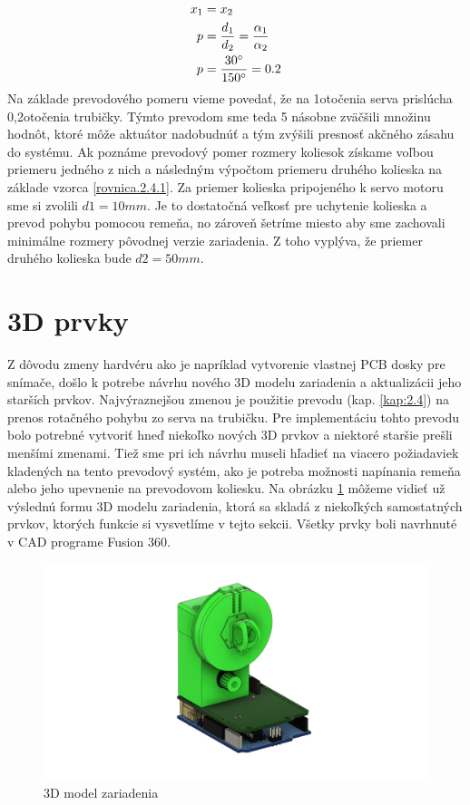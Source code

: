 \begin{align}
	\label{rovnica.2.4.2}
		x_1 &= x_2 \\
	p &=\frac{d_1}{d_2}=\frac{\alpha_1}{\alpha_2} \\
	p &=\frac{30\degree}{150\degree}=0.2
\end{align}
Na základe prevodového pomeru vieme povedať, že na 1\textdegree otočenia serva prislúcha 0,2\textdegree otočenia trubičky. Týmto prevodom sme teda 5 násobne zväčšili množinu hodnôt, ktoré môže aktuátor nadobudnúť a tým zvýšili presnosť akčného zásahu do systému. 
Ak poznáme prevodový pomer rozmery koliesok získame voľbou priemeru jedného z nich a následným výpočtom priemeru druhého kolieska na základe vzorca \ref{rovnica.2.4.1}. Za priemer kolieska pripojeného k servo motoru sme si zvolili $d1 = 10 mm$. Je to dostatočná veľkosť pre uchytenie kolieska a prevod pohybu pomocou remeňa, no zároveň šetríme miesto aby sme zachovali minimálne rozmery pôvodnej verzie zariadenia. Z toho vyplýva, že priemer druhého kolieska bude $d2 = 50 mm$.  





\section{3D prvky}
\label{kap:2.5}


Z dôvodu zmeny hardvéru ako je napríklad vytvorenie vlastnej PCB dosky pre snímače, došlo  k potrebe návrhu nového 3D modelu zariadenia a aktualizácii jeho starších prvkov.  Najvýraznejšou zmenou je použitie prevodu (kap. \ref{kap:2.4}) na prenos rotačného pohybu zo serva na trubičku. Pre implementáciu tohto prevodu bolo potrebné vytvoriť hneď niekoľko nových 3D prvkov a niektoré staršie prešli menšími zmenami. Tiež sme pri ich návrhu museli hľadieť na viacero požiadaviek kladených na tento prevodový systém, ako je potreba možnosti napínania remeňa alebo jeho upevnenie na prevodovom koliesku. Na obrázku \ref{OBRAZOK 2.5.1} môžeme vidieť už výslednú formu 3D modelu zariadenia, ktorá sa skladá z niekoľkých samostatných prvkov, ktorých funkcie si vysvetlíme v tejto sekcii. Všetky prvky boli navrhnuté v CAD programe Fusion 360.
\begin{figure}[!h]
	\centering
	\includegraphics[width=150mm]{obr/3Dmodel.png}
	\caption{3D model zariadenia }\label{OBRAZOK 2.5.1} 
\end{figure} 

